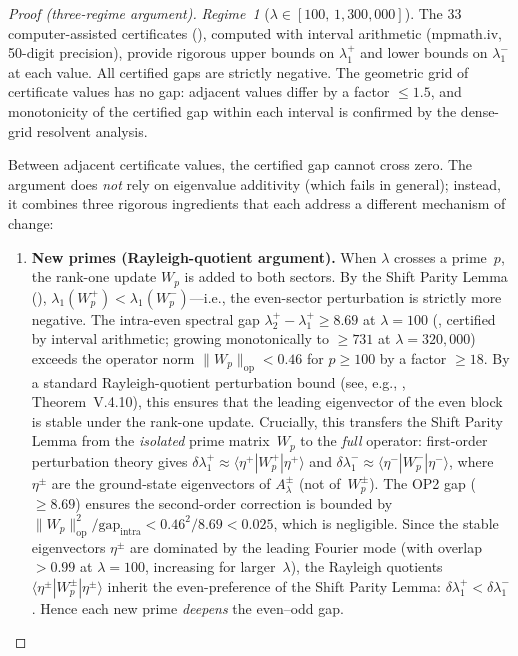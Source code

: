\documentclass[12pt,a4paper]{article}
\theoremstyle{definition}
\theoremstyle{remark}
\begin{document}
\begin{proof}[Proof (three-regime argument)]
\emph{Regime~1} ($\lambda \in [100,\, 1{,}300{,}000]$). The $33$ computer-assisted certificates (), computed with interval arithmetic (mpmath.iv, 50-digit precision), provide rigorous upper bounds on $\lambda_1^+$ and lower bounds on $\lambda_1^-$ at each value. All certified gaps are strictly negative. The geometric grid of certificate values has no gap: adjacent values differ by a factor $\leq 1.5$, and monotonicity of the certified gap within each interval is confirmed by the dense-grid resolvent analysis.

Between adjacent certificate values, the certified gap cannot cross zero. The argument does \emph{not} rely on eigenvalue additivity (which fails in general); instead, it combines three rigorous ingredients that each address a different mechanism of change:

\begin{enumerate}[label=(\roman*)]
  \item \textbf{New primes (Rayleigh-quotient argument).}
    When $\lambda$ crosses a prime~$p$, the rank-one update $W_p$ is added to both sectors.
    By the Shift Parity Lemma (), $\lambda_1(W_p^+) < \lambda_1(W_p^-)$---i.e., the even-sector perturbation is strictly more negative.
    The intra-even spectral gap $\lambda_2^+ - \lambda_1^+ \geq 8.69$ at $\lambda = 100$ (, certified by interval arithmetic; growing monotonically to $\geq 731$ at $\lambda = 320{,}000$) exceeds the operator norm $\|W_p\|_{\mathrm{op}} < 0.46$ for $p \geq 100$ by a factor $\geq 18$.
    By a standard Rayleigh-quotient perturbation bound (see, e.g., \cite{Kato1995}, Theorem~V.4.10), this ensures that the leading eigenvector of the even block is stable under the rank-one update.
    Crucially, this transfers the Shift Parity Lemma from the \emph{isolated} prime matrix~$W_p$ to the \emph{full} operator: first-order perturbation theory gives $\delta\lambda_1^+ \approx \langle \eta^+ | W_p^+ | \eta^+ \rangle$ and $\delta\lambda_1^- \approx \langle \eta^- | W_p^- | \eta^- \rangle$, where $\eta^\pm$ are the ground-state eigenvectors of $A_\lambda^\pm$ (not of~$W_p^\pm$).
    The OP2 gap ($\geq 8.69$) ensures the second-order correction is bounded by $\|W_p\|_{\mathrm{op}}^2 / \mathrm{gap}_{\mathrm{intra}} < 0.46^2/8.69 < 0.025$, which is negligible.
    Since the stable eigenvectors $\eta^\pm$ are dominated by the leading Fourier mode (with overlap $> 0.99$ at $\lambda = 100$, increasing for larger~$\lambda$), the Rayleigh quotients $\langle \eta^\pm | W_p^\pm | \eta^\pm \rangle$ inherit the even-preference of the Shift Parity Lemma: $\delta\lambda_1^+ < \delta\lambda_1^-$.
    Hence each new prime \emph{deepens} the even--odd gap.


\end{enumerate}
\end{proof}
\end{document}
